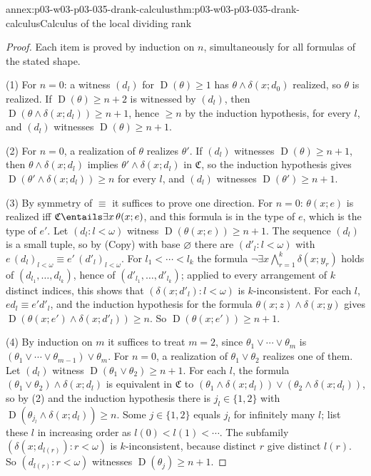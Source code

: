 \begin{annexitem}{annex:p03-w03-p03-035-drank-calculus}{thm:p03-w03-p03-035-drank-calculus}{Calculus of the local dividing rank}
\begin{proof}
Each item is proved by induction on \(n\), simultaneously for all formulas
of the stated shape.

(1) For \(n=0\): a witness \((d_l)\) for \(\operatorname D(\theta)\geq1\) has
\(\theta\wedge\delta(x;d_0)\) realized, so \(\theta\) is realized.  If
\(\operatorname D(\theta)\geq n+2\) is witnessed by \((d_l)\), then
\(\operatorname D(\theta\wedge\delta(x;d_l))\geq n+1\), hence \(\geq n\) by
the induction hypothesis, for every \(l\), and \((d_l)\) witnesses
\(\operatorname D(\theta)\geq n+1\).

(2) For \(n=0\), a realization of \(\theta\) realizes \(\theta'\).  If
\((d_l)\) witnesses \(\operatorname D(\theta)\geq n+1\), then
\(\theta\wedge\delta(x;d_l)\) implies \(\theta'\wedge\delta(x;d_l)\) in
\(\mathfrak C\), so the induction hypothesis gives
\(\operatorname D(\theta'\wedge\delta(x;d_l))\geq n\) for every \(l\), and
\((d_l)\) witnesses \(\operatorname D(\theta')\geq n+1\).

(3) By symmetry of \(\equiv\) it suffices to prove one direction.  For
\(n=0\): \(\theta(x;e)\) is realized iff
\(\mathfrak C\entails\exists x\,\theta(x;e)\), and this formula is in the
type of \(e\), which is the type of \(e'\).  Let \((d_l:l<\omega)\) witness
\(\operatorname D(\theta(x;e))\geq n+1\).  The sequence \((d_l)\) is a small
tuple, so by (Copy) with base \(\varnothing\) there are \((d'_l:l<\omega)\)
with \(e\,(d_l)_{l<\omega}\equiv e'\,(d'_l)_{l<\omega}\).  For
\(l_1<\cdots<l_k\) the formula
\(\neg\exists x\bigwedge_{r=1}^{k}\delta(x;y_r)\) holds of
\((d_{l_1},\ldots,d_{l_k})\), hence of \((d'_{l_1},\ldots,d'_{l_k})\); applied
to every arrangement of \(k\) distinct indices, this shows that
\((\delta(x;d'_l):l<\omega)\) is \(k\)-inconsistent.  For each \(l\),
\(ed_l\equiv e'd'_l\), and the induction hypothesis for the formula
\(\theta(x;z)\wedge\delta(x;y)\) gives
\(\operatorname D(\theta(x;e')\wedge\delta(x;d'_l))\geq n\).  So
\(\operatorname D(\theta(x;e'))\geq n+1\).

(4) By induction on \(m\) it suffices to treat \(m=2\), since
\(\theta_1\vee\cdots\vee\theta_m\) is \((\theta_1\vee\cdots\vee
\theta_{m-1})\vee\theta_m\).  For \(n=0\), a realization of
\(\theta_1\vee\theta_2\) realizes one of them.  Let \((d_l)\) witness
\(\operatorname D(\theta_1\vee\theta_2)\geq n+1\).  For each \(l\), the formula
\((\theta_1\vee\theta_2)\wedge\delta(x;d_l)\) is equivalent in
\(\mathfrak C\) to
\((\theta_1\wedge\delta(x;d_l))\vee(\theta_2\wedge\delta(x;d_l))\), so by (2)
and the induction hypothesis there is \(j_l\in\{1,2\}\) with
\(\operatorname D(\theta_{j_l}\wedge\delta(x;d_l))\geq n\).  Some
\(j\in\{1,2\}\) equals \(j_l\) for infinitely many \(l\); list these \(l\) in
increasing order as \(l(0)<l(1)<\cdots\).  The subfamily
\((\delta(x;d_{l(r)}):r<\omega)\) is \(k\)-inconsistent, because distinct
\(r\) give distinct \(l(r)\).  So \((d_{l(r)}:r<\omega)\) witnesses
\(\operatorname D(\theta_j)\geq n+1\).


\end{proof}
\end{annexitem}

